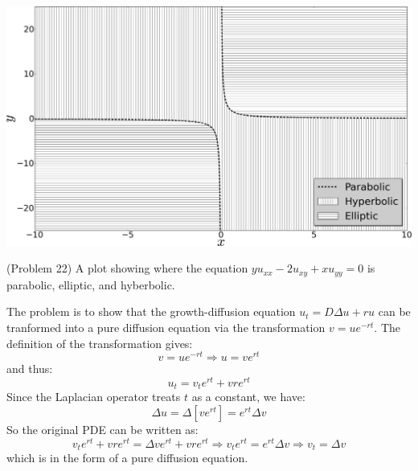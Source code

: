\begin{homeworkProblem}
\begin{enumerate}[(a)]
\end{enumerate}
\begin{figurehere}
\centering
\includegraphics[width=1\columnwidth]{22_1.png}
\caption{(Problem 22) A plot showing where the equation $yu_{xx}  - 2u_{xy}  + xu_{yy}  = 0$ is parabolic, elliptic, and hyberbolic.}
\end{figurehere}
\end{homeworkProblem}

\begin{homeworkProblem}
The problem is to show that the growth-diffusion equation $u_t  = D\Delta u + ru$ can be tranformed into a pure diffusion equation via the transformation $v = ue^{ - rt}$. The definition of the transformation gives:
 \[
v = ue^{ - rt}  \Rightarrow u = ve^{rt} 
\]
and thus:
\[
u_t  = v_t e^{rt}  + vre^{rt} 
\]
Since the Laplacian operator treats $t$ as a constant, we have:
\[
\Delta u = \Delta \left[ {ve^{rt} } \right] = e^{rt} \Delta v
\]
So the original PDE can be written as:
\[
v_t e^{rt}  + vre^{rt}  = \Delta ve^{rt}  + vre^{rt}  \Rightarrow v_t e^{rt}  = e^{rt} \Delta v \Rightarrow v_t  = \Delta v
\]
which is in the form of a pure diffusion equation.
\end{homeworkProblem}

